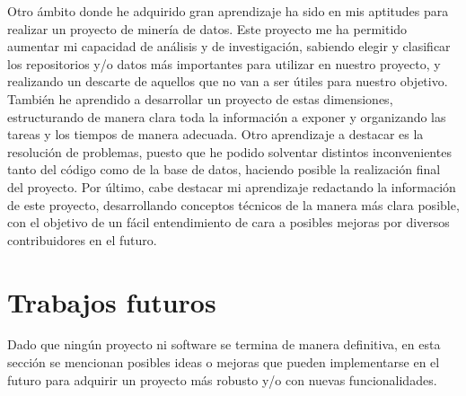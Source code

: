\documentclass[a4paper, 12pt]{book}
\begin{document}
Otro ámbito donde he adquirido gran aprendizaje ha sido en mis aptitudes para realizar un proyecto de minería de datos. Este proyecto me ha permitido aumentar mi capacidad de análisis y de investigación,
sabiendo elegir y clasificar los repositorios y/o datos más importantes para utilizar en nuestro proyecto, y realizando un descarte de aquellos que no van a ser útiles para nuestro objetivo.
También he aprendido a desarrollar un proyecto de estas dimensiones, estructurando de manera clara toda la información a exponer y organizando las tareas y los tiempos de manera adecuada.
Otro aprendizaje a destacar es la resolución de problemas, puesto que he podido solventar distintos inconvenientes tanto del código como de la base de datos, haciendo posible la realización
final del proyecto.
Por último, cabe destacar mi aprendizaje redactando la información de este proyecto, desarrollando conceptos técnicos de la manera más clara posible, con el objetivo de un fácil entendimiento
de cara a posibles mejoras por diversos contribuidores en el futuro.

\section{Trabajos futuros}
\label{sec:trabajos_futuros}

Dado que ningún proyecto ni software se termina de manera definitiva, en esta sección se mencionan posibles ideas o mejoras que pueden implementarse en el futuro para adquirir un proyecto más
robusto y/o con nuevas funcionalidades.
\end{document}
